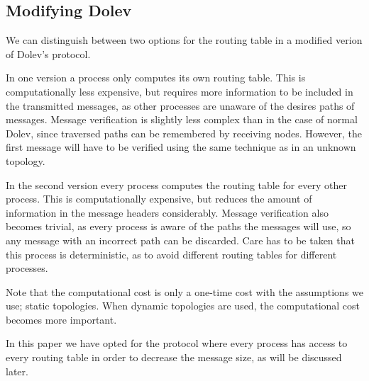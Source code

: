 \subsection{Modifying Dolev}
\label{contr:modifying-dolev}

We can distinguish between two options for the routing table in a modified verion of Dolev's protocol.

In one version a process only computes its own routing table. This is computationally less expensive, but requires more information to be included in the transmitted messages, as other processes are unaware of the desires paths of messages. Message verification is slightly less complex than in the case of normal Dolev, since traversed paths can be remembered by receiving nodes. However, the first message will have to be verified using the same technique as in an unknown topology. 

In the second version every process computes the routing table for every other process. This is computationally expensive, but reduces the amount of information in the message headers considerably. Message verification also becomes trivial, as every process is aware of the paths the messages will use, so any message with an incorrect path can be discarded. Care has to be taken that this process is deterministic, as to avoid different routing tables for different processes.

Note that the computational cost is only a one-time cost with the assumptions we use; static topologies. When dynamic topologies are used, the computational cost becomes more important. 

In this paper we have opted for the protocol where every process has access to every routing table in order to decrease the message size, as will be discussed later.



